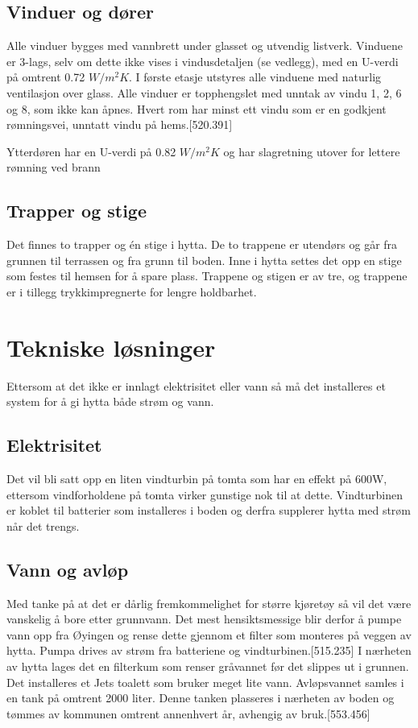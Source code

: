 \documentclass[12pt]{article}
\begin{document}
\subsection{Vinduer og dører}
Alle vinduer bygges med vannbrett under glasset og utvendig listverk. Vinduene er 3-lags, selv om dette ikke vises i vindusdetaljen (se vedlegg), med en U-verdi på omtrent 0.72 $W/m^2K$.
I første etasje utstyres alle vinduene med naturlig ventilasjon over glass.
Alle vinduer er topphengslet med unntak av vindu 1, 2, 6 og 8, som ikke kan åpnes. Hvert rom har minst ett vindu som er en godkjent rømningsvei, unntatt vindu på hems.[520.391]

Ytterdøren har en U-verdi på 0.82 $W/m^2K$ og har slagretning utover for lettere rømning ved brann

\subsection{Trapper og stige}

Det finnes to trapper og én stige i hytta. De to trappene er utendørs og går fra grunnen til terrassen og fra grunn til boden. Inne i hytta settes det opp en stige som festes til hemsen for å spare plass. Trappene og stigen er av tre, og trappene er i tillegg trykkimpregnerte for lengre holdbarhet.

\pagebreak
\section{Tekniske løsninger}
Ettersom at det ikke er innlagt elektrisitet eller vann så må det installeres et system for å gi hytta både strøm og vann.

\subsection{Elektrisitet}
Det vil bli satt opp en liten vindturbin på tomta som har en effekt på 600W, ettersom vindforholdene på tomta virker gunstige nok til at dette. Vindturbinen er koblet til batterier som installeres i boden og derfra supplerer hytta med strøm når det trengs.

\subsection{Vann og avløp}
Med tanke på at det er dårlig fremkommelighet for større kjøretøy så vil det være vanskelig å bore etter grunnvann. 
Det mest hensiktsmessige blir derfor å pumpe vann opp fra Øyingen og rense dette gjennom et filter som monteres på veggen av hytta. Pumpa drives av strøm fra batteriene og vindturbinen.[515.235]
I nærheten av hytta lages det en filterkum som renser gråvannet før det slippes ut i grunnen. Det installeres et Jets toalett som bruker meget lite vann. Avløpsvannet samles i en tank på omtrent 2000 liter. Denne tanken plasseres i nærheten av boden og tømmes av kommunen omtrent annenhvert år, avhengig av bruk.[553.456]
\end{document}
